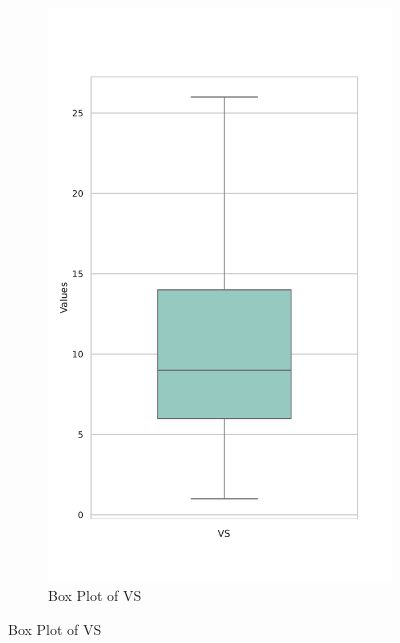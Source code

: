 \documentclass[jou]{apa7}
\begin{document}
\begin{figure}[H]
\begin{subfigure}[b]{0.45\linewidth}
		\includegraphics[width=\linewidth]{Box_Plot_of_VS.pdf}
		\caption{Box Plot of VS}
		\label{fig:BoxPlotVS}
	\end{subfigure}
	
	\vspace{1em} %
	

\end{figure}
\end{document}
